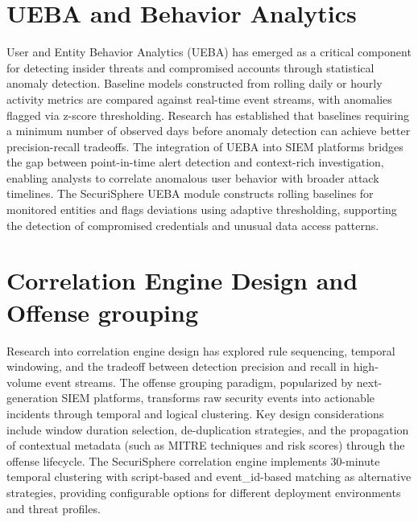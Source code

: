 \section{UEBA and Behavior Analytics}
User and Entity Behavior Analytics (UEBA) has emerged as a critical component for 
detecting insider threats and compromised accounts through statistical anomaly detection. 
Baseline models constructed from rolling daily or hourly activity metrics are compared 
against real-time event streams, with anomalies flagged via z-score thresholding. 
Research has established that baselines requiring a minimum number of observed days 
before anomaly detection can achieve better precision-recall tradeoffs. The integration 
of UEBA into SIEM platforms bridges the gap between point-in-time alert detection and 
context-rich investigation, enabling analysts to correlate anomalous user behavior with 
broader attack timelines. The SecuriSphere UEBA module constructs rolling baselines 
for monitored entities and flags deviations using adaptive thresholding, supporting 
the detection of compromised credentials and unusual data access patterns.

\section{Correlation Engine Design and Offense grouping}
Research into correlation engine design has explored rule sequencing, temporal windowing, 
and the tradeoff between detection precision and recall in high-volume event streams. 
The offense grouping paradigm, popularized by next-generation SIEM platforms, transforms 
raw security events into actionable incidents through temporal and logical clustering. 
Key design considerations include window duration selection, de-duplication strategies, 
and the propagation of contextual metadata (such as MITRE techniques and risk scores) 
through the offense lifecycle. The SecuriSphere correlation engine implements 30-minute 
temporal clustering with script-based and event_id-based matching as alternative strategies, 
providing configurable options for different deployment environments and threat profiles.

